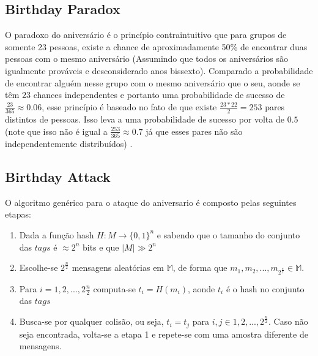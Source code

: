\documentclass[12pt]{article}
\begin{document}
\subsection{Birthday Paradox}

O paradoxo do aniversário é o princípio contraintuitivo que para grupos de somente 23 pessoas, existe a 
chance de aproximadamente 50\% de encontrar duas pessoas com o mesmo aniversário (Assumindo que
todos os aniversários são igualmente prováveis e desconsiderado anos bissexto). Comparado a probabilidade
de encontrar alguém nesse grupo com o mesmo aniversário que o seu, aonde se têm \(23\) chances independentes
e portanto uma probabilidade de sucesso de \(\frac{23}{365} \approx 0.06\), esse princípio é baseado
no fato de que existe \(\frac{23 * 22}{2} = 253\) pares distintos de pessoas. Isso leva a uma probabilidade
de sucesso por volta de \(0.5\) (note que isso não é igual a \(\frac{253}{365} \approx 0.7\) já que esses
pares não são independentemente distribuídos) \cite{stevens2012attacks}.

\iffalse
The birthday paradox is the counter-intuitive principle that for
groups of as few as \(23\) persons there is already a chance of about one half of finding two 
persons with the same birthday (assuming all birthdays are equally likely and disregarding 
leap years). Compared to finding someone in this group with your birthday where you have 
\(23\) independent chances and thus a success probability of \(\frac{23}{365} \approx 0.06\), this principle is 
based on the fact that there are \(\frac{23 * 22}{2} = 253\) distinct pairs of persons. This leads to 
a success probability of about \(0.5\) (note that this does not equal \(\frac{253}{365} \approx 0.7\) since these 
pairs are not independently distributed) \cite{stevens2012attacks}.
\fi

\subsection{Birthday Attack}

O algoritmo genérico para o ataque do aniversario é composto pelas seguintes etapas:
\begin{enumerate}
\item Dada a função hash \(H : M \to \{0,1\}^n\) e sabendo que o tamanho do conjunto das \(tags\) é \(\approx 2^n\) bits e que \(| M | \gg 2^n\)
\item Escolhe-se \(2^\frac{n}{2}\) mensagens aleatórias em \(\mathbb{M}\), de forma que \(m_1, m_2, ... , m_{2^\frac{n}{2}} \in \mathbb{M}\).
\item Para \(i = 1,2, ... , 2\frac{n}{2}\) computa-se \(t_i = H(m_i)\), aonde \(t_i\) é o hash no conjunto das \(tags\) %
\item Busca-se por qualquer colisão, ou seja, \(t_i = t_j\) para \(i, j \in {1, 2, ... , 2^\frac{n}{2}}\). Caso não seja encontrada, volta-se a etapa 1 e 
repete-se com uma amostra diferente de mensagens.
\end{enumerate}
\end{document}
